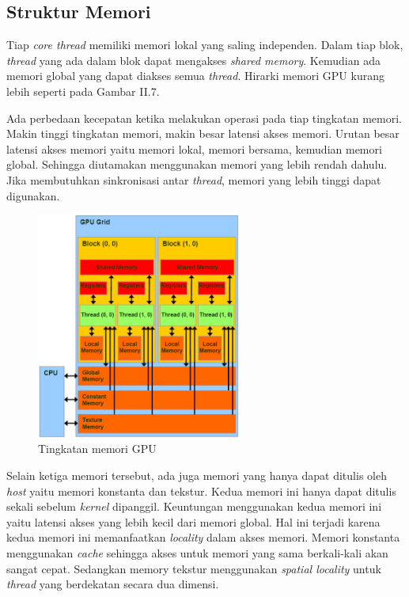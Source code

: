 
  \subsection{Struktur Memori}
    
    Tiap \emph{core thread} memiliki memori lokal yang saling independen. Dalam tiap blok, \emph{thread} yang ada dalam blok dapat mengakses \emph{shared memory}. Kemudian ada memori global yang dapat diakses semua \emph{thread}. Hirarki memori GPU kurang lebih seperti pada Gambar II.7.
    
    Ada perbedaan kecepatan ketika melakukan operasi pada tiap tingkatan memori. Makin tinggi tingkatan memori, makin besar latensi akses memori. Urutan besar latensi akses memori yaitu memori lokal, memori bersama, kemudian memori global. Sehingga diutamakan menggunakan memori yang lebih rendah dahulu. Jika membutuhkan sinkronisasi antar \emph{thread}, memori yang lebih tinggi dapat digunakan. 
    
    \begin{figure}[htb]
      \centering
      \includegraphics[width=0.6\textwidth]{resources/cudamem.png}
      \caption[Tingkatan memori GPU]{Tingkatan memori GPU \citep{cuda}}
    \end{figure}


    Selain ketiga memori tersebut, ada juga memori yang hanya dapat ditulis oleh \emph{host} yaitu memori konstanta dan tekstur. Kedua memori ini hanya dapat ditulis sekali sebelum \emph{kernel} dipanggil. Keuntungan menggunakan kedua memori ini yaitu latensi akses yang lebih kecil dari memori global. Hal ini terjadi karena kedua memori ini memanfaatkan \emph{locality} dalam akses memori. Memori konstanta menggunakan \emph{cache} sehingga akses untuk memori yang sama berkali-kali akan sangat cepat. Sedangkan memory tekstur menggunakan \emph{spatial locality} untuk \emph{thread} yang berdekatan secara dua dimensi.

